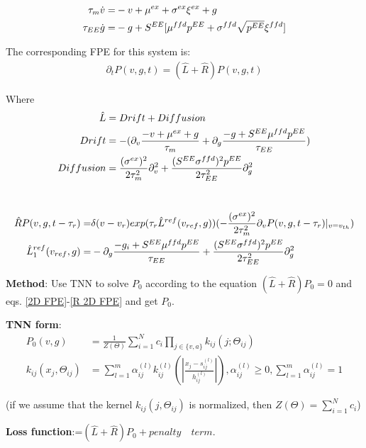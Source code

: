 \documentclass{article}
\begin{document}
	
	\begin{align}
		\tau_m \dot{v}=&-v+\mu^{ex}+\sigma^{ex}\xi^{ex}+{g}\notag\\
		\tau_{EE}\dot{g}=&-g+S^{EE}[\mu^{ffd}p^{EE}+\sigma^{ffd}\sqrt{p^{EE}}\xi^{ffd}]
		\label{Langevin 2D}
	\end{align}
	
	The corresponding FPE for this system is:
	\begin{align}
		\partial_tP(v,g,t)=(\hat{L}+\hat{R})P(v,g,t)
		\label{2D FPE}
	\end{align}
	
	Where
	\begin{align}
		\hat{L}&=Drift + Diffusion\notag\\
		Drift&=-(\partial_{v}\frac{-v+\mu^{ex}+g}{\tau_m}+\partial_{g}\frac{-g+S^{EE}\mu^{ffd}p^{EE}}{\tau_{EE}})\notag\\
		Diffusion&=\frac{(\sigma^{ex})^2}{2\tau_m^2}\partial_{v}^2+\frac{(S^{EE}\sigma^{ffd})^2p^{EE}}{2\tau_{EE}^2}\partial_{g}^2
	\end{align}
	
	~\\
	
	\begin{align}
		\hat{R}P(v,g,t-\tau_r)=&\delta(v-v_r)exp(\tau_r\hat{L}^{ref}(v_{ref}, g))(-\frac{(\sigma^{ex})^2}{2\tau_m^2}\partial_{v}P(v,g,t-\tau_r)|_{v=v_{th}})\notag\\
		\hat{L}_1^{ref}(v_{ref},g)=&-\partial_{g}\frac{-g_i+S^{EE}\mu^{ffd}p^{EE}}{\tau_{EE}} + \frac{(S^{EE}\sigma^{ffd})^2p^{EE}}{2\tau_{EE}^2}\partial_{g}^2
		\label{R 2D FPE}
	\end{align}
	
	\textbf{Method}: Use TNN to solve $P_0$ according to the equation $(\hat{L}+\hat{R})P_0=0$ and eqs. \eqref{2D FPE}-\eqref{R 2D FPE} and get $P_0$.
	
	\textbf{TNN form}:
	\begin{align} P_0(v,g)&=\frac{1}{Z(\Theta)}\sum_{i=1}^{N}c_i\prod_{j\in\{v,a\}}k_{ij}(j;\Theta_{ij})\\
	k_{ij}(x_j,\Theta_{ij})&=\sum_{l=1}^m\alpha_{ij}^{(l)}k_{ij}^{(l)}(|\frac{x_j-s_{ij}^{(l)}}{h_{ij}^{(l)}}|),\alpha_{ij}^{(l)}\geq 0,\sum_{l=1}^m\alpha_{ij}^{(l)}=1
	\end{align}
	
	(if we assume that the kernel $k_{ij}(j,\Theta_{ij})$ is normalized, then $Z(\Theta)=\sum_{i=1}^{N}c_i$)
	
	\textbf{Loss function}:=$(\hat{L}+\hat{R})P_0+penalty \quad term$.
	
\end{document}
